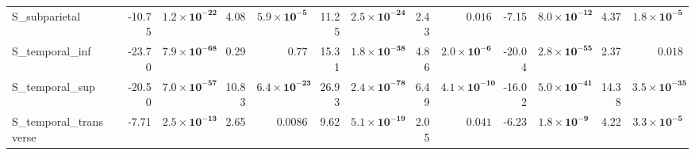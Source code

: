 {\begin{longtable}{llrrrrrrrrrrrr}
S\_subparietal &  & -10.75 & $\mathbf{1.2{\times}10^{-22}}$ & 4.08 & $\mathbf{5.9{\times}10^{-5}}$ & 11.25 & $\mathbf{2.5{\times}10^{-24}}$ & 2.43 & $0.016$ & -7.15 & $\mathbf{8.0{\times}10^{-12}}$ & 4.37 & $\mathbf{1.8{\times}10^{-5}}$ \\
S\_temporal\_inf &  & -23.70 & $\mathbf{7.9{\times}10^{-68}}$ & 0.29 & $0.77$ & 15.31 & $\mathbf{1.8{\times}10^{-38}}$ & 4.86 & $\mathbf{2.0{\times}10^{-6}}$ & -20.04 & $\mathbf{2.8{\times}10^{-55}}$ & 2.37 & $0.018$ \\
S\_temporal\_sup &  & -20.50 & $\mathbf{7.0{\times}10^{-57}}$ & 10.83 & $\mathbf{6.4{\times}10^{-23}}$ & 26.93 & $\mathbf{2.4{\times}10^{-78}}$ & 6.49 & $\mathbf{4.1{\times}10^{-10}}$ & -16.02 & $\mathbf{5.0{\times}10^{-41}}$ & 14.38 & $\mathbf{3.5{\times}10^{-35}}$ \\
S\_temporal\_transverse &  & -7.71 & $\mathbf{2.5{\times}10^{-13}}$ & 2.65 & $0.0086$ & 9.62 & $\mathbf{5.1{\times}10^{-19}}$ & 2.05 & $0.041$ & -6.23 & $\mathbf{1.8{\times}10^{-9}}$ & 4.22 & $\mathbf{3.3{\times}10^{-5}}$ \\
\end{longtable}}
